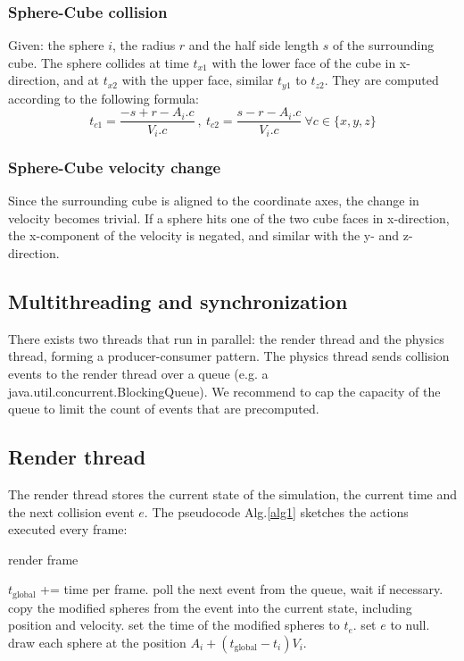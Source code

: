 \documentclass[journal, letterpaper]{IEEEtran}
\begin{document}
\subsubsection{Sphere-Cube collision}\label{SCC}
Given: the sphere $i$, the radius $r$ and the half side length $s$ of the surrounding cube. The sphere collides at time $t_{x1}$ with the lower face of the cube in x-direction, and at $t_{x2}$ with the upper face, similar $t_{y1}$ to $t_{z2}$. They are computed according to the following formula:
\begin{equation*}
t_{c1}=\frac{-s+r-A_i.c}{V_i.c} \ , \ t_{c2}=\frac{s-r-A_i.c}{V_i.c} \ \forall c\in \{x,y,z\}
\label{eq:SCC}
\end{equation*}

\subsubsection{Sphere-Cube velocity change}\label{SCV}
Since the surrounding cube is aligned to the coordinate axes, the change in velocity becomes trivial. If a sphere hits one of the two cube faces in x-direction, the x-component of the velocity is negated, and similar with the y- and z-direction.

\subsection{Multithreading and synchronization}
There exists two threads that run in parallel: the render thread and the physics thread, forming a producer-consumer pattern. The physics thread sends collision events to the render thread over a queue (e.g. a java.util.concurrent.BlockingQueue). We recommend to cap the capacity of the queue to limit the count of events that are precomputed.

\subsection{Render thread}
The render thread stores the current state of the simulation, the current time and the next collision event $e$.
The pseudocode Alg.\ref{alg1} sketches the actions executed every frame:
\begin{algorithm}
\caption{render frame}
\label{alg1}
\begin{algorithmic}
	\STATE $t_\text{global}$ += time per frame.
	\REPEAT
			\STATE poll the next event from the queue, wait if necessary.
		\ENDIF
			\STATE copy the modified spheres from the event into the current state, including position and velocity.
			\STATE set the time of the modified spheres to $t_e$.
			\STATE set $e$ to null.
		\ENDIF
	\STATE draw each sphere at the position $A_i + (t_\text{global}-t_i)V_i$.
\end{algorithmic}
\end{algorithm}
\end{document}
